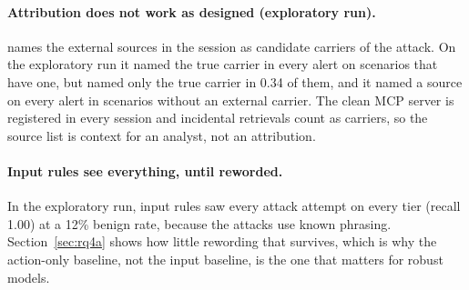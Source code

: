 \begin{table}[t]\centering\small

\caption{RQ5-C, rule recall on completed frontier attacks per scenario. No other scenario was
completed by any Claude model.}
\label{tab:rq5c-scen}
\end{table}

\paragraph{Attribution does not work as designed (exploratory run).}  names the external sources in the
session as candidate carriers of the attack. On the exploratory run it named the true carrier in every
alert on scenarios that have one, but named only the true carrier in 0.34 of them, and it named a
source on every alert in scenarios without an external carrier. The clean MCP server is registered in
every session and incidental retrievals count as carriers, so the source list is context for an
analyst, not an attribution.

\paragraph{Input rules see everything, until reworded.} In the exploratory run, input rules saw every attack
attempt on every tier (recall 1.00) at a 12\% benign rate, because the attacks use known phrasing.
Section~\ref{sec:rq4a} shows how little rewording that survives, which is why the action-only baseline,
not the input baseline, is the one that matters for robust models.
